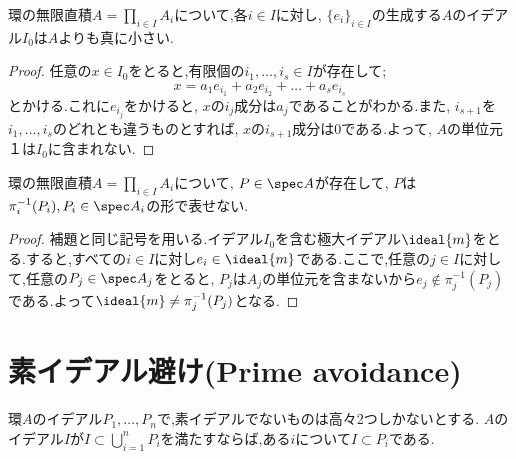 \begin{lem}
	環の無限直積$A=\prod_{i\in I}A_i$について,各$i\in I$に対し, $\{e_i\}_{i\in I}$の生成する$A$のイデアル$I_0$は$A$よりも真に小さい.
\end{lem}

\begin{proof}
	任意の$x\in I_0$をとると,有限個の$i_1,\dots,i_s\in I$が存在して;
	\[x=a_1e_{i_1}+a_2e_{i_2}+\dots+a_se_{i_s}\]
	とかける.これに$e_{i_j}$をかけると, $x$の$i_j$成分は$a_j$であることがわかる.また, $i_{s+1}$を$i_1,\dots,i_s$のどれとも違うものとすれば, $x$の$i_{s+1}$成分は0である.よって, $A$の単位元$１$は$I_0$に含まれない.
\end{proof}

\begin{prop}
	環の無限直積$A=\prod_{i\in I}A_i$について, $P\in\spec A$が存在して, $P$は$\pi^{-1}_i(P_i), P_i\in\spec A_i$の形で表せない.
\end{prop}

\begin{proof}
	補題と同じ記号を用いる.イデアル$I_0$を含む極大イデアル$\ideal{m}$をとる.すると,すべての$i\in I$に対し$e_i\in\ideal{m}$である.ここで,任意の$j\in I$に対して,任意の$P_j\in\spec A_j$をとると, $P_j$は$A_j$の単位元を含まないから$e_j\not\in\pi^{-1}_j(P_j)$である.よって$\ideal{m}\neq\pi_j^{-1}(P_j)$となる.
\end{proof}

\section{素イデアル避け(Prime avoidance)}

\begin{lem}\label{lem:Prime avoidance}
	環$A$のイデアル$P_1,\dots, P_n$で,素イデアルでないものは高々2つしかないとする. $A$のイデアル$I$が$I\subset\bigcup_{i=1}^n P_i$を満たすならば,ある$i$について$I\subset P_i$である.
\end{lem}

